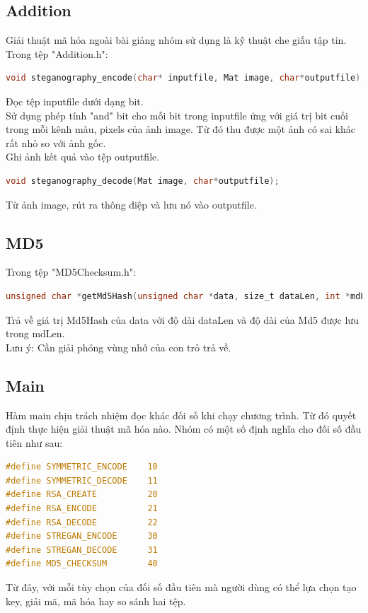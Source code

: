 \documentclass[a4paper]{article}
\begin{document}
	\subsection{Addition}
	Giải thuật mã hóa ngoài bài giảng nhóm sử dụng là kỹ thuật che giấu tập tin. Trong tệp "Addition.h":\\
	\begin{lstlisting}[language=C]
void steganography_encode(char* inputfile, Mat image, char*outputfile);
	\end{lstlisting}
	Đọc tệp inputfile dưới dạng bit.\\
	Sử dụng phép tính "and" bit cho mỗi bit trong inputfile ứng với giá trị bit cuối trong mỗi kênh màu, pixels của ảnh image. Từ đó thu được một ảnh có sai khác rất nhỏ so với ảnh gốc.\\
	Ghi ảnh kết quả vào tệp outputfile.\\

	\begin{lstlisting}[language=C]
void steganography_decode(Mat image, char*outputfile);
	\end{lstlisting}
	Từ ảnh image, rút ra thông điệp và lưu nó vào outputfile.

	\subsection{MD5}
	Trong tệp "MD5Checksum.h":\\
	\begin{lstlisting}[language=C]
unsigned char *getMd5Hash(unsigned char *data, size_t dataLen, int *mdLen);
	\end{lstlisting}
	Trả về giá trị Md5Hash của data với độ dài dataLen và độ dài của Md5 được lưu trong mdLen.\\
	Lưu ý: Cần giải phóng vùng nhớ của con trỏ trả về.

	\subsection{Main}
	Hàm main chịu trách nhiệm đọc khác đối số khi chạy chương trình. Từ đó quyết định thực hiện giải thuật mã hóa nào. Nhóm có một số định nghĩa cho đối số đầu tiên như sau:\\
	\begin{lstlisting}[language=C]
#define SYMMETRIC_ENCODE	10
#define SYMMETRIC_DECODE	11
#define RSA_CREATE			20
#define RSA_ENCODE			21
#define RSA_DECODE			22
#define STREGAN_ENCODE		30
#define STREGAN_DECODE		31
#define MD5_CHECKSUM		40
	\end{lstlisting}
	Từ đây, với mỗi tùy chọn của đối số đầu tiên mà người dùng có thể lựa chọn tạo key, giải mã, mã hóa hay so sánh hai tệp.\\
\end{document}
